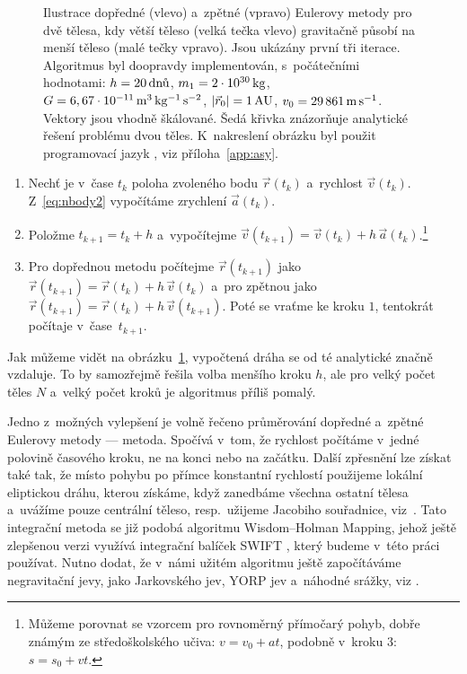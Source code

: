 \documentclass[A4paper, 12pt, oneside]{book}
\begin{document}
\begin{figure} 
	\centering 
	\begin{subfigure}[b]{0.45\textwidth}
	\end{subfigure}
	\begin{subfigure}[b]{0.45\textwidth}
	\end{subfigure}
	\caption{Ilustrace dopředné (vlevo) a~zpětné (vpravo) Eulerovy metody pro dvě tělesa, kdy větší těleso (velká tečka vlevo) gravitačně působí na menší těleso (malé tečky vpravo). Jsou ukázány první tři iterace. Algoritmus byl doopravdy implementován, s~počátečními hodnotami: $h=20\,{\rm \text{dnů}}$, $m_1=2\cdot10^{30}\,{\rm kg}$, $G=6,67\cdot10^{-11}\,{\rm m^3\,kg^{-1}\,s^{-2}}$, $|\vec{r}_0|=1\,{\rm AU}$, $v_0=29\,861\,{\rm m\,s^{-1}}$. Vektory jsou vhodně škálované. Šedá křivka znázorňuje analytické řešení problému dvou těles. K~nakreslení obrázku byl použit programovací jazyk , viz příloha~\ref{app:asy}.} \label{fig:euler}
\end{figure}
\pagebreak
\begin{enumerate}
	\item Nechť je v~čase $t_k$ poloha zvoleného bodu $\vec{r}(t_k)$ a~rychlost $\vec{v}(t_k)$. Z~\eqref{eq:nbody2} vypočítáme zrychlení $\vec{a}(t_k)$. 
	\item Položme $t_{k+1} = t_{k}+h$ a~vypočítejme $\vec{v}(t_{k+1}) = \vec{v}(t_k) + h\,\vec{a}(t_k)$.\footnote{Můžeme porovnat se vzorcem pro rovnoměrný přímočarý pohyb, dobře známým ze středoškolského učiva: $v = v_0 + at$, podobně v~kroku $3$: $s = s_0 + vt$.}
	\item Pro dopřednou metodu počítejme $\vec{r}(t_{k+1})$ jako $\vec{r}(t_{k+1}) = \vec{r}(t_k) + h\,\vec{v}(t_k)$ a~pro zpětnou jako $\vec{r}(t_{k+1}) = \vec{r}(t_k) + h\,\vec{v}(t_{k+1})$. Poté se vraťme ke kroku $1$, tentokrát počítaje v~čase~$t_{k+1}$. 
\end{enumerate}

Jak můžeme vidět na obrázku~\ref{fig:euler}, vypočtená dráha se od té analytické značně vzdaluje. To by samozřejmě řešila volba menšího kroku $h$, ale pro velký počet těles $N$ a~velký počet kroků je algoritmus příliš pomalý.

Jedno z~možných vylepšení je volně řečeno průměrování dopředné a~zpětné Eulerovy metody ---  metoda. Spočívá v~tom, že rychlost počítáme v~jedné polovině časového kroku, ne na konci nebo na začátku. Další zpřesnění lze získat také tak, že místo pohybu po přímce konstantní rychlostí použijeme lokální eliptickou dráhu, kterou získáme, když zanedbáme všechna ostatní tělesa a~uvážíme pouze centrální těleso, resp.\ užijeme Jacobiho souřadnice, viz~\cite{wisdom91}. Tato integrační metoda se již podobá algoritmu Wisdom--Holman Mapping, jehož ještě zlepšenou verzi využívá integrační balíček SWIFT \cite{levison94}, který budeme v~této práci používat. Nutno dodat, že v~námi užitém algoritmu ještě započítáváme negravitační jevy, jako Jarkovského jev, YORP jev a~náhodné srážky, viz \cite{broz11}.
\end{document}
